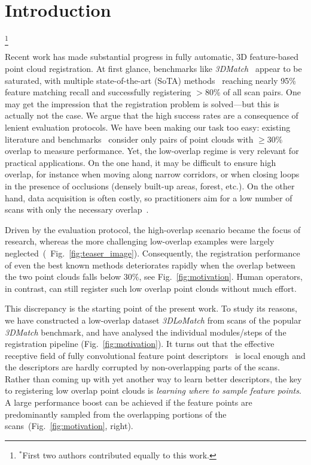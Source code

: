 \section{Introduction}
\label{sec:intro}
{\let\thefootnote\relax\footnote{{$^*$First two authors contributed equally to this work.}}}

Recent work has made substantial progress in fully automatic, 3D feature-based point cloud registration. At first glance, benchmarks like \textit{3DMatch}~\cite{zeng20163dmatch} appear to be saturated, with multiple state-of-the-art (SoTA) methods~\cite{gojcic20193DSmoothNet,Choy2019FCGF,bai2020d3feat} reaching nearly 95\% feature matching recall and successfully registering $>$80\% of all scan pairs.
One may get the impression that the registration problem is solved---but this is actually not the case. We argue that the high success rates are a consequence of lenient evaluation protocols. We have been making our task too easy:
existing literature and benchmarks~\cite{choi2015robust, zeng20163dmatch, khoury2017CGF} consider only pairs of point clouds with $\geq$30\% overlap to measure performance.
Yet, the low-overlap regime is very relevant for practical applications. On the one hand, it may be difficult to ensure high overlap, for instance when moving along narrow corridors, or when closing loops in the presence of occlusions (densely built-up areas, forest, etc.). On the other hand, data acquisition is often costly, so practitioners aim for a low number of scans with only the necessary overlap~\cite{yang2019extreme,yang2020extreme}. 


Driven by the evaluation protocol, the high-overlap scenario became the focus of research, whereas the more challenging low-overlap examples were largely neglected~(\cf~Fig.~\ref{fig:teaser_image}).
Consequently, the registration performance of even the best known methods deteriorates rapidly when the overlap between the two point clouds falls below 30\%, see Fig.~\ref{fig:motivation}.
Human operators, in contrast, can still register such low overlap point clouds without much effort.%

This discrepancy is the starting point of the present work. %
To %
study its reasons, we have constructed a low-overlap dataset \textit{3DLoMatch} from scans of the popular \textit{3DMatch} benchmark, and have analysed the individual modules/steps of the registration pipeline (Fig.~\ref{fig:motivation}).
It turns out that the effective receptive field of fully convolutional feature point descriptors~\cite{Choy2019FCGF,bai2020d3feat} is local enough and the descriptors are hardly corrupted by non-overlapping parts of the scans. Rather than coming up with yet another way to learn better descriptors, the key to registering low overlap point clouds is \emph{learning where to sample feature points}. A large performance boost can be achieved if the feature points are predominantly sampled from the overlapping portions of the scans~(Fig.~\ref{fig:motivation}, right).

